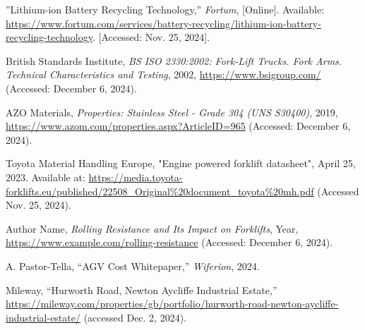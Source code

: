 \documentclass[12pt]{article}
\begin{document}
\begin{thebibliography}{99}
''Lithium-ion Battery Recycling Technology,''
\textit{Fortum}, [Online]. Available: \url{https://www.fortum.com/services/battery-recycling/lithium-ion-battery-recycling-technology}. [Accessed: Nov. 25, 2024].

British Standards Institute, \textit{BS ISO 2330:2002: Fork-Lift Trucks. Fork Arms. Technical Characteristics and Testing}, 2002, \url{https://www.bsigroup.com/} (Accessed: December 6, 2024).

AZO Materials, \textit{Properties: Stainless Steel - Grade 304 (UNS S30400)}, 2019, \url{https://www.azom.com/properties.aspx?ArticleID=965} (Accessed: December 6, 2024).

Toyota Material Handling Europe, "Engine powered forklift datasheet", April 25, 2023. Available at: \url{https://media.toyota-forklifts.eu/published/22508_Original%20document_toyota%20mh.pdf} (Accessed Nov. 25, 2024).

Author Name, \textit{Rolling Resistance and Its Impact on Forklifts}, Year, \url{https://www.example.com/rolling-resistance} (Accessed: December 6, 2024).

A. Pastor-Tella, ``AGV Cost Whitepaper,'' \textit{Wiferion}, 2024.

Mileway, “Hurworth Road, Newton Aycliffe Industrial Estate,” \url{https://mileway.com/properties/gb/portfolio/hurworth-road-newton-aycliffe-industrial-estate/} (accessed Dec. 2, 2024).

\end{thebibliography}

 
\end{document}
